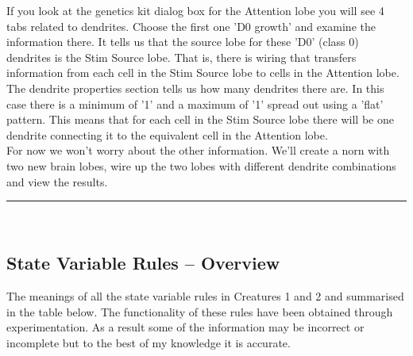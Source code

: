 \documentclass[11pt,twoside,a4paper]{article}
\begin{document}
If you look at the genetics kit dialog box for the Attention lobe you will see 4 tabs related to dendrites. Choose the first one 'D0 growth' and examine the information there. It tells us that the source lobe for these 'D0' (class 0) dendrites is the Stim Source lobe. That is, there is wiring that transfers information from each cell in the Stim Source lobe to cells in the Attention lobe.~\\

The dendrite properties section tells us how many dendrites there are. In this case there is a minimum of '1' and a maximum of '1' spread out using a 'flat' pattern. This means that for each cell in the Stim Source lobe there will be one dendrite connecting it to the equivalent cell in the Attention lobe.~\\

For now we won't worry about the other information. We'll create a norn with two new brain lobes, wire up the two lobes with different dendrite combinations and view the results.~\\


\rule{10cm}{0.5mm}~\\

\subsection{State Variable Rules -- Overview}

The meanings of all the state variable rules in Creatures 1 and 2 and summarised in the table below. The functionality of these rules have been obtained through experimentation. As a result some of the information may be incorrect or incomplete but to the best of my knowledge it is accurate. ~\\
\end{document}

